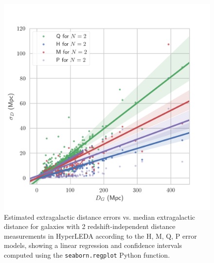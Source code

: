 \documentclass[a4paper,fleqn,usenatbib]{mnras}
\begin{document}
\begin{figure}
	\includegraphics[scale=0.7]{HLlow.png}
    \caption{Estimated extragalactic distance errors vs. median extragalactic distance for galaxies with 2 redshift-independent distance measurements in HyperLEDA according to the H, M, Q, P error models, showing a linear regression and confidence intervals computed using the \texttt{seaborn.regplot} Python function.}
    \label{fig:HLlow}
\end{figure}
\end{document}
